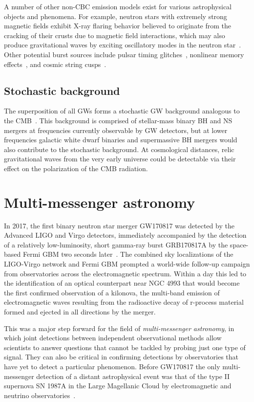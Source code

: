 A number of other non-CBC emission models exist for various astrophysical objects and phenomena.
For example, neutron stars with extremely strong magnetic fields exhibit X-ray flaring behavior believed to originate from the cracking of their crusts due to magnetic field interactions, which may also produce gravitational waves by exciting oscillatory modes in the neutron star~\citep{Lasky_2015}.
Other potential burst sources include pulsar timing glitches~\citep{pulsar_s5}, nonlinear memory effects~\citep{memory_o2}, and cosmic string cusps~\citep{strings_o3}.


\subsection{Stochastic background}

The superposition of all \acp{GW} forms a stochastic \ac{GW} background analogous to the \ac{CMB}~\citep{Christensen_2018}.
This background is comprised of stellar-mass binary \ac{BH} and \ac{NS} mergers at frequencies currently observable by \ac{GW} detectors, but at lower frequencies galactic white dwarf binaries and supermassive BH mergers would also contribute to the stochastic background.
At cosmological distances, relic gravitational waves from the very early universe could be detectable via their effect on the polarization of the \ac{CMB} radiation.


\section{Multi-messenger astronomy}\label{sec:mma}

In 2017, the first binary neutron star merger GW170817 was detected by the Advanced LIGO and Virgo detectors, immediately accompanied by the detection of a relatively low-luminosity, short gamma-ray burst GRB170817A by the space-based Fermi \ac{GBM} two seconds later~\citep{gw170817}.
The combined sky localizations of the LIGO-Virgo network and Fermi GBM prompted a world-wide follow-up campaign from observatories across the electromagnetic spectrum.
Within a day this led to the identification of an optical counterpart near NGC 4993 that would become the first confirmed observation of a kilonova, the multi-band emission of electromagnetic waves resulting from the radioactive decay of r-process material formed and ejected in all directions by the merger.

This was a major step forward for the field of \textit{multi-messenger astronomy}, in which joint detections between independent observational methods allow scientists to answer questions that cannot be tackled by probing just one type of signal.
They can also be critical in confirming detections by observatories that have yet to detect a particular phenomenon.
Before GW170817 the only multi-messenger detection of a distant astrophysical event was that of the type II supernova SN 1987A in the Large Magellanic Cloud by electromagnetic and neutrino observatories~\citep{Hirata_1987, Bionta_1987, Alekseev_1988}.

